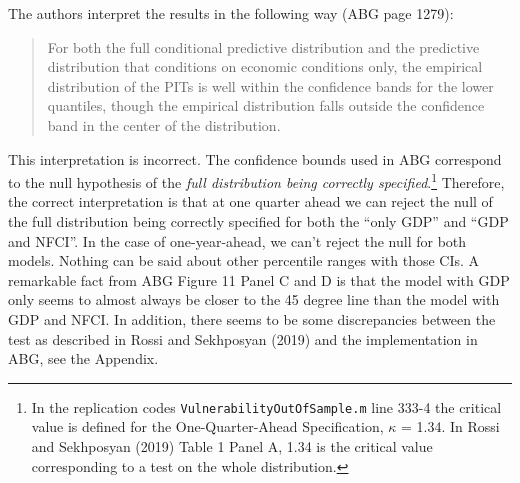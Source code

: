\documentclass[12pt,]{article}
\let\rmarkdownfootnote\footnote%
\def\footnote{\protect\rmarkdownfootnote}
\begin{document}
The authors interpret the results in the following way (ABG page 1279):

\begin{quote}
For both the full conditional predictive distribution and the predictive
distribution that conditions on economic conditions only, the empirical
distribution of the PITs is well within the confidence bands for the
lower quantiles, though the empirical distribution falls outside the
confidence band in the center of the distribution.
\end{quote}

This interpretation is incorrect. The confidence bounds used in ABG
correspond to the null hypothesis of the
\textit{full distribution being correctly specified}.\footnote{In the replication codes \texttt{VulnerabilityOutOfSample.m} line 333-4 the critical value is defined for the One-Quarter-Ahead Specification, $\kappa$ = 1.34. In Rossi and Sekhposyan (2019) Table 1 Panel A, 1.34 is the critical value corresponding to a test on the whole distribution.}
Therefore, the correct interpretation is that at one quarter ahead we
can reject the null of the full distribution being correctly specified
for both the ``only GDP'' and ``GDP and NFCI''. In the case of
one-year-ahead, we can't reject the null for both models. Nothing can be
said about other percentile ranges with those CIs. A remarkable fact
from ABG Figure 11 Panel C and D is that the model with GDP only seems
to almost always be closer to the 45 degree line than the model with GDP
and NFCI. In addition, there seems to be some discrepancies between the
test as described in Rossi and Sekhposyan (2019) and the implementation
in ABG, see the Appendix.
\end{document}
